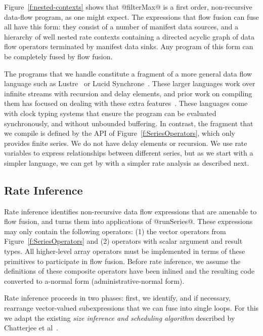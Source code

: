 Figure~\ref{f:nested-contexts} shows that @filterMax@ is a first order, non-recursive data-flow program, as one might expect. The expressions that flow fusion can fuse all have this form: they consist of a number of manifest data sources, and a hierarchy of well nested rate contexts containing a directed acyclic graph of data flow operators terminated by manifest data sinks. Any program of this form can be completely fused by flow fusion.

The programs that we handle constitute a fragment of a more general data flow language such as Lustre~\cite{Caspi:Lustre} or Lucid Synchrone~\cite{Pouzet:lucid-synchrone}. These larger languages work over infinite streams with recursion and delay elements, and prior work on compiling them has focused on dealing with these extra features~\cite{Halbwachs:data-flow-compilation}. These languages come with clock typing systems that ensure the program can be evaluated synchronously, and without unbounded buffering. In contrast, the fragment that we compile is defined by the API of Figure~\ref{f:SeriesOperators}, which only provides finite series. We do not have delay elements or recursion. We use rate variables to express relationships between different series, but as we start with a simpler language, we can get by with a simpler rate analysis as described next.


\subsection{Rate Inference}
\label{s:rate-inference}

Rate inference identifies non-recursive data flow expressions that are amenable to flow fusion, and turns them into applications of @runSeries@. These expressions may only contain the following operators: (1) the vector operators from Figure~\ref{f:SeriesOperators} and (2) operators with scalar argument and result types. All higher-level array operators must be implemented in terms of these primitives to participate in flow fusion. Before rate inference, we assume the definitions of these composite operators have been inlined and the resulting code converted to a-normal form (administrative-normal form).

Rate inference proceeds in two phases: first, we identify, and if necessary, rearrange vector-valued subexpressions that we can fuse into single loops. For this we adapt the existing \emph{size inference and scheduling algorithm} described by Chatterjee et al~\cite{Chatterjee:size-access-inference}.

